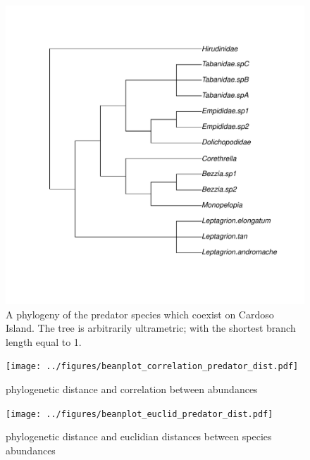 \documentclass[10pt]{article}
\begin{document}
\begin{spacing}{2}
\begin{figure}
  \centering
  \includegraphics{../figures/predatorPhylogenyCardoso2008.pdf}
  \caption{A phylogeny of the predator species which coexist on Cardoso
Island.  The tree is arbitrarily ultrametric; with the shortest branch
length equal to 1.}
\label{fig:predphylo}
\end{figure}

\begin{figure}
  \centering
  \texttt{[image: ../figures/beanplot\_correlation\_predator\_dist.pdf]}
  \caption{phylogenetic distance and correlation between abundances}
\label{fig:abdcorphylo}
\end{figure}

\begin{figure}
  \centering
  \texttt{[image: ../figures/beanplot\_euclid\_predator\_dist.pdf]}
  \caption{phylogenetic distance and euclidian distances between species abundances}
  \label{fig:euclidphylo}
\end{figure}


\end{spacing}
\end{document}
